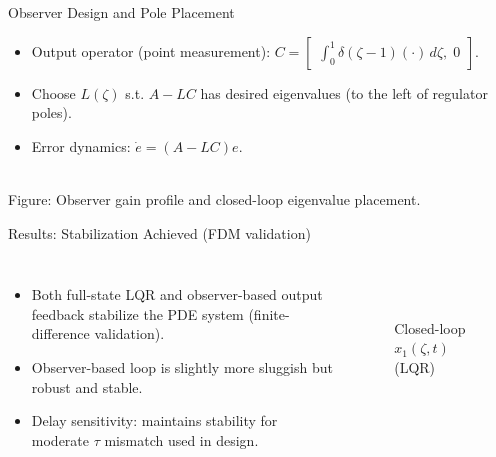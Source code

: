 \documentclass[8pt]{beamer}
\begin{document}
\begin{frame}{Observer Design and Pole Placement}
\begin{itemize}
  \item Output operator (point measurement): 
  $\displaystyle {C}=\begin{bmatrix}\int_0^1\delta(\zeta-1)(\cdot)\,d\zeta,\; 0\end{bmatrix}$.
  \item Choose ${L}(\zeta)$ s.t. ${A}-{L}{C}$ has desired eigenvalues (to the left of regulator poles).
  \item Error dynamics: $\dot e=({A}-{L}{C})e$.
\end{itemize}
\centering
\hfill
\\
{\footnotesize Figure: Observer gain profile and closed-loop eigenvalue placement.}
\end{frame}

\begin{frame}{Results: Stabilization Achieved (FDM validation)}
\begin{columns}[t]
\begin{itemize}
  \item Both full-state LQR and observer-based output feedback stabilize the PDE system (finite-difference validation).
  \item Observer-based loop is slightly more sluggish but robust and stable.
  \item Delay sensitivity: maintains stability for moderate $\tau$ mismatch used in design.
\end{itemize}

\begin{figure}
    \centering
    \\[-0.2em]
    \caption{Closed-loop $x_1(\zeta,t)$ (LQR)}
\end{figure}
\vspace{0.4em}
\end{columns}
\end{frame}
\end{document}
